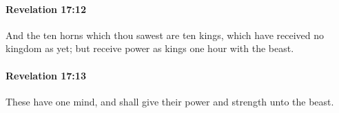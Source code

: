 		\paragraph{Revelation 17:12} %
			\label{REVELATIONNT-17-12}

			And the ten horns which thou sawest are ten kings, which have received no kingdom as yet; but receive power as kings one hour with the beast.

			\begin{framed}
			\scriptsize
				\begin{compactdesc}
					\item[SBLG] 
				\end{compactdesc}
			\end{framed}

		\paragraph{Revelation 17:13} %
			\label{REVELATIONNT-17-13}

			These have one mind, and shall give their power and strength unto the beast.

